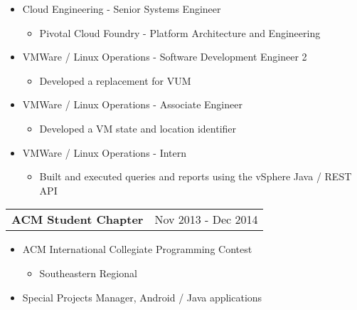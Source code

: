 \documentclass{book}
\newenvironment{myitemize}
{ \begin{itemize}
	\setlength{\itemsep}{0pt}
	\setlength{\parskip}{0pt}
	\setlength{\parsep}{0pt}     }
{ \end{itemize}                  }
\begin{document}
	\begin{myitemize}

		\item Cloud Engineering - Senior Systems Engineer

			\begin{myitemize}

					\item Pivotal Cloud Foundry - Platform Architecture and Engineering

			\end{myitemize}

		\item VMWare / Linux Operations - Software Development Engineer 2

			\begin{myitemize}

					\item Developed a replacement for VUM

			\end{myitemize}	

		\item VMWare / Linux Operations - Associate Engineer 

			\begin{myitemize}

					\item Developed a VM state and location identifier

			\end{myitemize}	

		\item VMWare / Linux Operations - Intern 

			\begin{myitemize}

					\item Built and executed queries and reports using the vSphere Java / REST API

			\end{myitemize}	

		\end{myitemize}	
		
\begin{tabular}{L{4.75in}R{1.75in}}

	{\large {\bfseries ACM Student Chapter}} & Nov 2013 - Dec 2014 \\

\end{tabular}

	\begin{myitemize}
		\item ACM International Collegiate Programming Contest 
			\begin{myitemize}
				\item Southeastern Regional
			\end{myitemize}
		\item Special Projects Manager, Android / Java applications 
	\end{myitemize}
\end{document}

